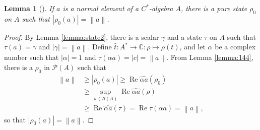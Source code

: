 \documentclass[11pt,a4paper]{report}
\theoremstyle{plain}
\newtheorem{lemma}{Lemma}
\theoremstyle{definition}
\newcommand{\1}{\mathbbm{1}}
\newcommand{\C}{\mathbb{C}}
\renewcommand{\S}{\mathscr{S}}
\renewcommand{\P}[1]{\mathscr{P}(#1)}
\DeclareMathOperator{\Real}{\operatorname{Re}}
\begin{document}
\begin{lemma}[{\cite[4.3.8,(iv)]{kadison83}}]\label{lemma:pure2}
	If $a$ is a normal element of a $C^\ast$-algebra $A$, there is a pure state $\rho_0$ on $A$ such 
	that $|\rho_0(a)|=\left\|a\right\|$.
\end{lemma}
\begin{proof}
	By Lemma \ref{lemma:state2}, there is a scalar $\gamma$ and a state $\tau$ on $A$ such that $
	\tau(a)=\gamma$ and $|\gamma|=\left\|a\right\|$. Define $\hat t :A^\ast\to\C:\rho \mapsto\rho(t)$, and let $
	\alpha$ be a complex number such that $|\alpha|=1$ and $\tau(\alpha a) = |c| = \left\|a\right\|$. From 
	Lemma \ref{lemma:144}, there is a $\rho_0$ in $\P A$ such that 
	\begin{align*}
				\left\|a\right\|
		&\geq 	|\rho_0(a)| \geq \Real \widehat {\alpha a}(\rho_0)					\\
		&\geq 	\sup_{\rho\in \S(A)} \Real\widehat {\alpha a}(\rho) 				\\
		&\geq	\Real\widehat {\alpha a}(\tau) = \Real\tau(\alpha a) = \left\|a\right\|,
	\end{align*}
	so that $|\rho_0(a)|=\left\|a\right\|$.
\end{proof}
\end{document}
